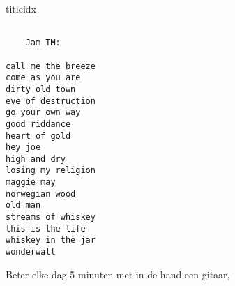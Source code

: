 \documentclass[a4,openany,portrait,tikz]{article}
\begin{document}
\begin{songs}{titleidx}
\renewcommand{\thesongnum}{U}
	

\renewcommand{\thesongnum}{W}
	
	
	
	
	
	
	
	

\newpage

\renewcommand{\thesongnum}{Y}
	
	
\newpage

\renewcommand{\thesongnum}{Z}
	
	
	
\newpage

\newpage
\chordsoff
\chordson



\newpage
\begin{Large}
\begin{verbatim}

    Jam TM:

call me the breeze
come as you are
dirty old town
eve of destruction
go your own way
good riddance
heart of gold
hey joe
high and dry
losing my religion
maggie may
norwegian wood
old man
streams of whiskey
this is the life
whiskey in the jar
wonderwall
\end{verbatim}
\end{Large}



\newpage

\renewcommand{\thesongnum}{Jam}
  
  
  
  
  
  
  
  
  
  
  
  
  
  
  
  
%  

  
%  
%  





			Beter elke dag 5 minuten met in de hand een gitaar,


\end{songs}
\end{document}
